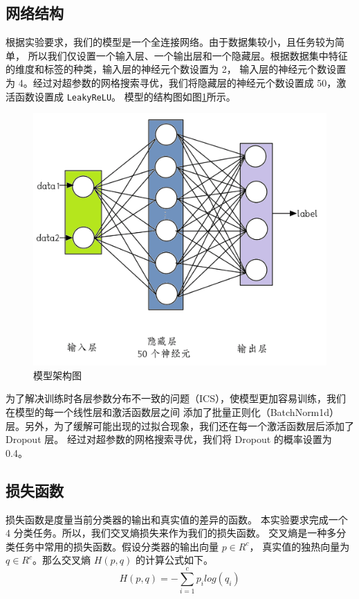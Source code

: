 \documentclass[supercite]{Experimental_Report}
\theoremstyle{definition}
\begin{document}
\subsection{网络结构}
根据实验要求，我们的模型是一个全连接网络。由于数据集较小，且任务较为简单，
所以我们仅设置一个输入层、一个输出层和一个隐藏层。根据数据集中特征的维度和标签的种类，输入层的神经元个数设置为 2，
输入层的神经元个数设置为 4。经过对超参数的网格搜索寻优，我们将隐藏层的神经元个数设置成 50，激活函数设置成 \texttt{LeakyReLU}。
模型的结构图如图\ref{FC模型结构图}所示。
\begin{figure}[H]
	\begin{center}
		\includegraphics[scale=0.20]{../images/网络架构.png}
		\caption{模型架构图}
		\label{FC模型结构图}
	\end{center}
\end{figure}
为了解决训练时各层参数分布不一致的问题（ICS），使模型更加容易训练，我们在模型的每一个线性层和激活函数层之间
添加了批量正则化（BatchNorm1d）层。另外，为了缓解可能出现的过拟合现象，我们还在每一个激活函数层后添加了 Dropout 层。
经过对超参数的网格搜索寻优，我们将 Dropout 的概率设置为 0.4。
\subsection{损失函数}
损失函数是度量当前分类器的输出和真实值的差异的函数。
本实验要求完成一个 4 分类任务。所以，我们交叉熵损失来作为我们的损失函数。
交叉熵是一种多分类任务中常用的损失函数。假设分类器的输出向量 $p\in R^c$，
真实值的独热向量为 $q\in R^c$。那么交叉熵 $H(p, q)$ 的计算公式如下。
$$
H(p, q)=-\sum_{i=1}^{c}p_i log(q_i)
$$
\end{document}
